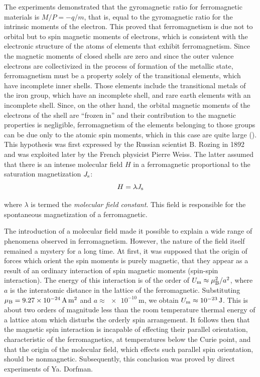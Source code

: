 The experiments demonstrated that the gyromagnetic ratio for ferromagnetic materials is $M/P=-q/m$, that is, equal to the gyromagnetic ratio for the intrinsic moments of the electron. This proved that ferromagnetism is due not to orbital but to spin magnetic moments of electrons, which is consistent with the electronic structure of the atoms of elements that exhibit ferromagnetism. Since the magnetic moments of closed shells are zero and since the outer valence electrons are collectivized in the process of formation of the metallic state, ferromagnetism must be a property solely of the transitional elements, which have incomplete inner shells. Those elements include the transitional metals of the iron group, which have an incomplete  shell, and rare earth elements with an incomplete  shell. Since, on the other hand, the orbital magnetic moments of the electrons of the  shell are ``frozen in'' and their contribution to the magnetic properties is negligible, ferromagnetism of the elements belonging to those groups can be due only to the atomic spin moments, which in this case are quite large (). This hypothesis was first expressed by the Russian scientist B. Rozing in 1892 and was exploited later by the French physicist Pierre Weiss. The latter assumed that there is an intense molecular field $H$ in a ferromagnetic proportional to the saturation magnetization $J_{\text{s}}$:
\begin{equation}\label{eq:7_69}
    H = \lambda J_{\text{s}}
\end{equation}

\noindent
where $\lambda$ is termed the \textit{molecular field constant}. This field is responsible for the spontaneous magnetization of a ferromagnetic.

The introduction of a molecular field made it possible to explain a wide range of phenomena observed in ferromagnetism. However, the nature of the field itself remained a mystery for a long time. At first, it was supposed that the origin of forces which orient the spin moments is purely magnetic, that they appear as a result of an ordinary interaction of spin magnetic moments (spin-spin interaction). The energy of this interaction is of the order of $U_{\text{m}}\approx\mu_{\text{B}}^2/a^2$, where $a$ is the interatomic distance in the lattice of the ferromagnetic. Substituting $\mu_{\text{B}}=\SI{9.27e-24}{\ampere\metre\squared}$ and $a\approx\SI{e-10}{\metre}$, we obtain $U_{\text{m}}\approx\SI{e-23}{\joule}$. This is about two orders of magnitude less than the room temperature thermal energy of a lattice atom which disturbs the orderly spin arrangement. It follows then that the magnetic spin interaction is incapable of effecting their parallel orientation, characteristic of the ferromagnetics, at temperatures below the Curie point, and that the origin of the molecular field, which effects such parallel spin orientation, should be nonmagnetic. Subsequently, this conclusion was proved by direct experiments of Ya. Dorfman.

